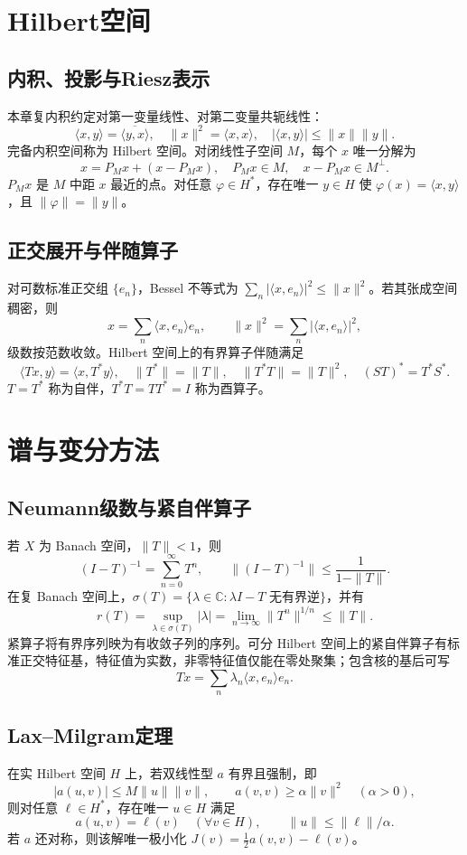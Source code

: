 \documentclass[../main.tex]{subfiles}
\begin{document}
\section{Hilbert空间}
\subsection{内积、投影与Riesz表示}
本章复内积约定对第一变量线性、对第二变量共轭线性：
\[
\langle x,y\rangle=\overline{\langle y,x\rangle},\quad
\|x\|^2=\langle x,x\rangle,\quad
|\langle x,y\rangle|\le\|x\|\|y\|.
\]
完备内积空间称为 Hilbert 空间。对闭线性子空间 $M$，每个 $x$ 唯一分解为
\[
x=P_Mx+(x-P_Mx),\quad P_Mx\in M,\quad x-P_Mx\in M^\perp.
\]
$P_Mx$ 是 $M$ 中距 $x$ 最近的点。对任意 $\varphi\in H^*$，存在唯一 $y\in H$ 使 $\varphi(x)=\langle x,y\rangle$，且 $\|\varphi\|=\|y\|$。
\subsection{正交展开与伴随算子}
对可数标准正交组 $\{e_n\}$，Bessel 不等式为 $\sum_n|\langle x,e_n\rangle|^2\le\|x\|^2$。若其张成空间稠密，则
\[
x=\sum_n\langle x,e_n\rangle e_n,\qquad
\|x\|^2=\sum_n|\langle x,e_n\rangle|^2,
\]
级数按范数收敛。Hilbert 空间上的有界算子伴随满足
\[
\langle Tx,y\rangle=\langle x,T^*y\rangle,\quad
\|T^*\|=\|T\|,\quad\|T^*T\|=\|T\|^2,\quad(ST)^*=T^*S^*.
\]
$T=T^*$ 称为自伴，$T^*T=TT^*=I$ 称为酉算子。
\section{谱与变分方法}
\subsection{Neumann级数与紧自伴算子}
若 $X$ 为 Banach 空间，$\|T\|<1$，则
\[
(I-T)^{-1}=\sum_{n=0}^\infty T^n,\qquad\|(I-T)^{-1}\|\le\frac1{1-\|T\|}.
\]
在复 Banach 空间上，$\sigma(T)=\{\lambda\in\mathbb C:\lambda I-T\text{ 无有界逆}\}$，并有
\[
r(T)=\sup_{\lambda\in\sigma(T)}|\lambda|=\lim_{n\to\infty}\|T^n\|^{1/n}\le\|T\|.
\]
紧算子将有界序列映为有收敛子列的序列。可分 Hilbert 空间上的紧自伴算子有标准正交特征基，特征值为实数，非零特征值仅能在零处聚集；包含核的基后可写
\[
Tx=\sum_n\lambda_n\langle x,e_n\rangle e_n.
\]
\subsection{Lax--Milgram定理}
在实 Hilbert 空间 $H$ 上，若双线性型 $a$ 有界且强制，即
\[
|a(u,v)|\le M\|u\|\|v\|,\qquad a(v,v)\ge\alpha\|v\|^2\quad(\alpha>0),
\]
则对任意 $\ell\in H^*$，存在唯一 $u\in H$ 满足
\[
a(u,v)=\ell(v)\quad(\forall v\in H),\qquad\|u\|\le\|\ell\|/\alpha.
\]
若 $a$ 还对称，则该解唯一极小化 $J(v)=\tfrac12a(v,v)-\ell(v)$。
\end{document}
